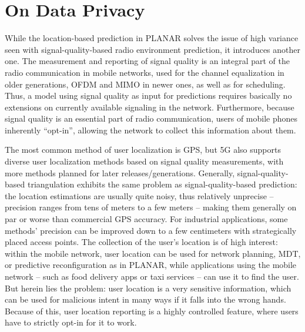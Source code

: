 	\section{On Data Privacy}
		\label{cha:pred_control:sec:privacy}
	
		While the location-based prediction in \ac{PLANAR} solves the issue of high variance seen with signal-quality-based radio environment prediction, it introduces another one.
		The measurement and reporting of signal quality is an integral part of the radio communication in mobile networks, used for the channel equalization in older generations, \ac{OFDM} and \ac{MIMO} in newer ones, as well as for scheduling.
		Thus, a model using signal quality as input for predictions requires basically no extensions on currently available signaling in the network.
		Furthermore, because signal quality is an essential part of radio communication, users of mobile phones inherently ``opt-in'', allowing the network to collect this information about them.
		
		The most common method of user localization is \ac{GPS}, but \ac{5G} also supports diverse user localization methods based on signal quality measurements, with more methods planned for later releases/generations.
		Generally, signal-quality-based triangulation exhibits the same problem as signal-quality-based prediction: the location estimations are usually quite noisy, thus relatively unprecise -- precision ranges from tens of meters to a few meters -- making them generally on par or worse than commercial \ac{GPS} accuracy.
		For industrial applications, some methods' precision can be improved down to a few centimeters with strategically placed access points.
		The collection of the user's location is of high interest: within the mobile network, user location can be used for network planning, \ac{MDT}, or predictive reconfiguration as in \ac{PLANAR}, while applications using the mobile network -- such as food delivery apps or taxi services -- can use it to find the user.
		But herein lies the problem: user location is a very sensitive information, which can be used for malicious intent in many ways if it falls into the wrong hands.
		Because of this, user location reporting is a highly controlled feature, where users have to strictly opt-in for it to work.
		
